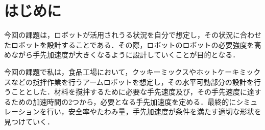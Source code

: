 \section{はじめに}\label{ux306fux3058ux3081ux306b}

今回の課題は，ロボットが活用されうる状況を自分で想定し，その状況に合わせたロボットを設計することである．その際，ロボットのロボットの必要強度を高めながら手先加速度が大きくなるように設計していくことが目的となる．

今回の課題で私は，食品工場において，クッキーミックスやホットケーキミックスなどの撹拌作業を行うアームロボットを想定し，その水平可動部分の設計を行うこととした．材料を撹拌するために必要な手先速度及び，その手先速度に達するための加速時間の2つから，必要となる手先加速度を定める．最終的にシミュレーションを行い，安全率やたわみ量，手先加速度が条件を満たす適切な形状を見つけていく．
